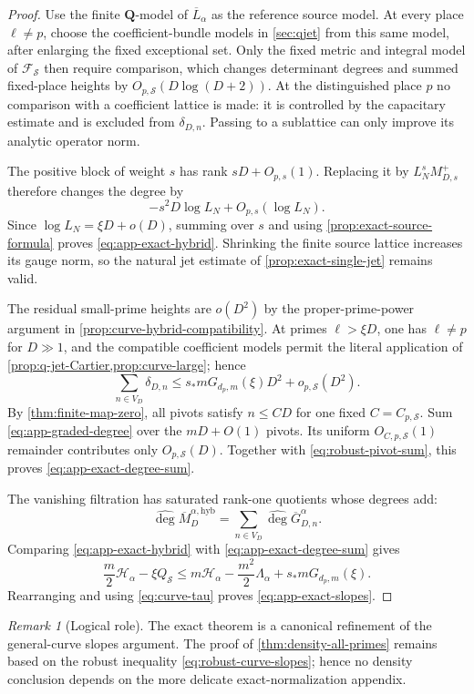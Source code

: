 \documentclass[11pt]{article}
\theoremstyle{definition}
\theoremstyle{remark}
\newtheorem{remark}[remark]{Remark}
\newcommand{\Q}{\mathbf Q}
\newcommand{\calF}{\mathcal F}
\newcommand{\widehatdeg}{\widehat{\deg}}
\newcommand{\Energy}{\mathscr H}
\newcommand{\LambdaAH}{\Lambda}
\begin{document}
\begin{proof}
Use the finite $\Q$-model of $\overline L_\alpha$ as the reference source
model.  At every place $\ell\ne p$, choose the coefficient-bundle models in
\cref{sec:qjet} from this same model, after enlarging the fixed exceptional
set.  Only the fixed metric and integral model of
$\calF_{\mathcal S}$ then require comparison, which changes determinant
degrees and summed fixed-place heights by
$O_{p,\mathcal S}(D\log(D+2))$.  At the distinguished place $p$ no comparison
with a coefficient lattice is made: it is controlled by the capacitary
estimate and is excluded from $\delta_{D,n}$.  Passing to a sublattice can
only improve its analytic operator norm.

The positive block of weight $s$ has rank $sD+O_{p,s}(1)$.  Replacing it by
$L_N^sM_{D,s}^+$ therefore changes the degree by
\[
 -s^2D\log L_N+O_{p,s}(\log L_N).
\]
Since $\log L_N=\xi D+o(D)$, summing over $s$ and using
\cref{prop:exact-source-formula} proves \eqref{eq:app-exact-hybrid}.
Shrinking the finite source lattice increases its gauge norm, so the natural
jet estimate of \cref{prop:exact-single-jet} remains valid.

The residual small-prime heights are $o(D^2)$ by the proper-prime-power
argument in \cref{prop:curve-hybrid-compatibility}.  At primes
$\ell>\xi D$, one has $\ell\ne p$ for $D\gg1$, and the compatible coefficient
models permit the literal application of
\cref{prop:q-jet-Cartier,prop:curve-large}; hence
\[
 \sum_{n\in V_D}\delta_{D,n}
 \le s_*mG_{d_p,m}(\xi)D^2+o_{p,\mathcal S}(D^2).
\]
By \cref{thm:finite-map-zero}, all pivots satisfy $n\le CD$ for one fixed
$C=C_{p,\mathcal S}$.  Sum \eqref{eq:app-graded-degree} over the
$mD+O(1)$ pivots.  Its uniform $O_{C,p,\mathcal S}(1)$ remainder contributes
only $O_{p,\mathcal S}(D)$.  Together with
\eqref{eq:robust-pivot-sum}, this proves
\eqref{eq:app-exact-degree-sum}.

The vanishing filtration has saturated rank-one quotients whose degrees add:
\[
 \widehatdeg\overline M_D^{\alpha,\mathrm{hyb}}
 =\sum_{n\in V_D}\widehatdeg\overline G_{D,n}^\alpha.
\]
Comparing \eqref{eq:app-exact-hybrid} with
\eqref{eq:app-exact-degree-sum} gives
\[
 \frac m2\Energy_\alpha-\xi Q_{\mathcal S}
 \le m\Energy_\alpha-\frac{m^2}{2}\LambdaAH_\alpha
    +s_*mG_{d_p,m}(\xi).
\]
Rearranging and using \eqref{eq:curve-tau} proves
\eqref{eq:app-exact-slopes}.
\end{proof}

\begin{remark}[Logical role]
The exact theorem is a canonical refinement of the general-curve slopes
argument.  The proof of \cref{thm:density-all-primes} remains based on the
robust inequality \eqref{eq:robust-curve-slopes}; hence no density conclusion
depends on the more delicate exact-normalization appendix.
\end{remark}
\end{document}

